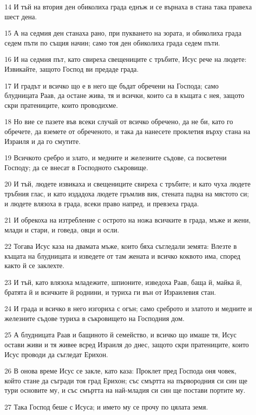 \par 14 И тъй на втория ден обиколиха града еднъж и се върнаха в стана така правеха шест дена.
\par 15 А на седмия ден станаха рано, при пукването на зората, и обиколиха града седем пъти по същия начин; само тоя ден обиколиха града седем пъти.
\par 16 И на седмия път, като свиреха свещениците с тръбите, Исус рече на людете: Извикайте, защото Господ ви предаде града.
\par 17 И градът и всичко що е в него ще бъдат обречени на Господа; само блудницата Раав, да остане жива, тя и всички, които са в къщата с нея, защото скри пратениците, които проводихме.
\par 18 Но вие се пазете във всеки случай от всичко обречено, да не би, като го обречете, да вземете от обреченото, и така да нанесете проклетия върху стана на Израиля и да го смутите.
\par 19 Всичкото сребро и злато, и медните и железните съдове, са посветени Господу; да се внесат в Господното съкровище.
\par 20 И тъй, людете извикаха и свещениците свиреха с тръбите; и като чуха людете тръбния глас, и като издадоха людете гръмлив вик, стената падна на мястото си; и людете влязоха в града, всеки право напред, и превзеха града.
\par 21 И обрекоха на изтребление с острото на ножа всичките в града, мъже и жени, млади и стари, и говеда, овци и осли.
\par 22 Тогава Исус каза на двамата мъже, които бяха съгледали земята: Влезте в къщата на блудницата и изведете от там жената и всичко коквото има, според както й се заклехте.
\par 23 И тъй, като влязоха младежите, шпионите, изведоха Раав, баща й, майка й, братята й и всичките й роднини, и туриха ги вън от Израилевия стан.
\par 24 И града и всичко в него изгориха с огън; само среброто и златото и медните и железните съдове туриха в съкровището на Господния дом.
\par 25 А блудницата Раав и бащиното й семейство, и всичко що имаше тя, Исус остави живи и тя живее всред Израиля до днес, защото скри пратениците, които Исус проводи да съгледат Ерихон.
\par 26 В онова време Исус се закле, като каза: Проклет пред Господа оня човек, който стане да съгради тоя град Ерихон; със смъртта на първородния си син ще тури основите му, и със смъртта на най-младия си син ще постави портите му.
\par 27 Така Господ беше с Исуса; и името му се прочу по цялата земя.

